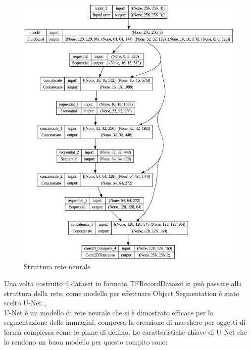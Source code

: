 \documentclass[a4paper,12pt]{report}
\begin{document}
      \begin{figure}[H]
        \centering
        \begin{minipage}{0.8\textwidth}
          \centering
          \includegraphics[width=\textwidth]{assets/images/methods/deep/network/network.png}   
          \caption{Struttura rete neurale}
        \end{minipage}
      \end{figure}
      Una volta costruito il dataset in formato TFRecordDataset si può passare
      alla struttura della rete, come modello per effettuare Object Segmentation
      è stato scelto U-Net \cite{ronneberger2015u},
      \\ 
      U-Net è un modello di rete neurale che si è dimostrato efficace per la segmentazione delle immagini,
      compresa la creazione di maschere per oggetti di forma complessa come le pinne di delfino.
      Le caratteristiche chiave di U-Net che lo rendono un buon modello per questo compito sono:
\end{document}

